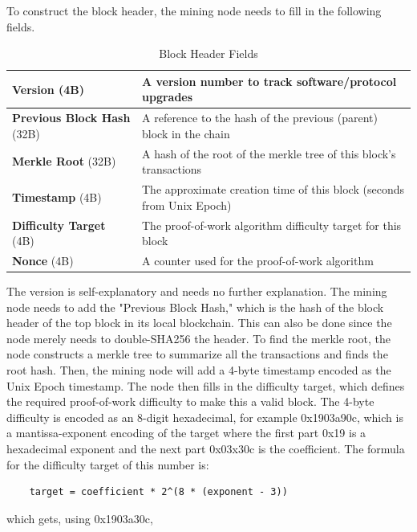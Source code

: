 \documentclass{article}
\newcounter{example}[section]
\newcounter{algo}[section]
\newcounter{code}[section]
\begin{document}
    To construct the block header, the mining node needs to fill in the following fields.

    \begin{table}[H]
    \centering
    \begin{tabular}{|p{}|p{}|}
    \hline
    \textbf{Version} (4B) & A version number to track software/protocol upgrades \\
    \hline
    \textbf{Previous Block Hash} (32B) & A reference to the hash of the previous (parent) block in the chain \\
    \hline
    \textbf{Merkle Root} (32B) & A hash of the root of the merkle tree of this block's transactions \\
    \hline
    \textbf{Timestamp} (4B) & The approximate creation time of this block (seconds from Unix Epoch) \\
    \hline
    \textbf{Difficulty Target} (4B) & The proof-of-work algorithm difficulty target for this block \\
    \hline
    \textbf{Nonce} (4B) & A counter used for the proof-of-work algorithm \\
    \hline
    \end{tabular}
    \caption{Block Header Fields}
    \end{table}

    The version is self-explanatory and needs no further explanation. The mining node needs to add the "Previous Block Hash," which is the hash of the block header of the top block in its local blockchain. This can also be done since the node merely needs to double-SHA256 the header. To find the merkle root, the node constructs a merkle tree to summarize all the transactions and finds the root hash. Then, the mining node will add a 4-byte timestamp encoded as the Unix Epoch timestamp. The node then fills in the difficulty target, which defines the required proof-of-work difficulty to make this a valid block. The 4-byte difficulty is encoded as an 8-digit hexadecimal, for example 0x1903a90c, which is a mantissa-exponent encoding of the target where the first part 0x19 is a hexadecimal exponent and the next part 0x03x30c is the coefficient. The formula for the difficulty target of this number is:

    \begin{lstlisting}
    target = coefficient * 2^(8 * (exponent - 3))
    \end{lstlisting}

    which gets, using 0x1903a30c,
\end{document}
